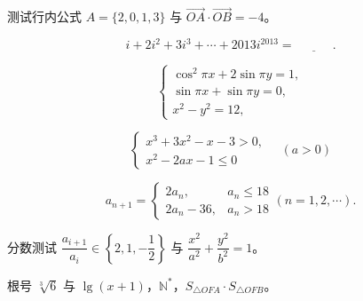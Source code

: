 \documentclass[11pt]{ctexart}
\begin{document}
测试行内公式 \(A=\{2,0,1,3\}\) 与 \(\overrightarrow{OA}\cdot\overrightarrow{OB}=-4\)。

\[
i+2i^2+3i^3+\cdots+2013i^{2013}=\underline{\hspace{3em}}.
\]

\[
\begin{cases}
\cos^2\pi x+2\sin\pi y=1,\\
\sin\pi x+\sin\pi y=0,\\
x^2-y^2=12,
\end{cases}
\]

\[
\begin{cases}
x^3+3x^2-x-3>0,\\
x^2-2ax-1\le0
\end{cases}\quad(a>0)
\]

\[
a_{n+1} = \begin{cases} 2a_n, & a_n \le 18 \\ 2a_n - 36, & a_n > 18 \end{cases} (n = 1, 2, \cdots).
\]

分数测试 \(\dfrac{a_{i+1}}{a_i}\in\left\{2,1,-\dfrac12\right\}\) 与 \(\dfrac{x^2}{a^2}+\dfrac{y^2}{b^2}=1\)。

根号 \(\sqrt[3]{6}\) 与 \(\lg(x+1)\)，\(\mathbb{N}^*\)，\(S_{\triangle OFA}\cdot S_{\triangle OFB}\)。
\end{document}
